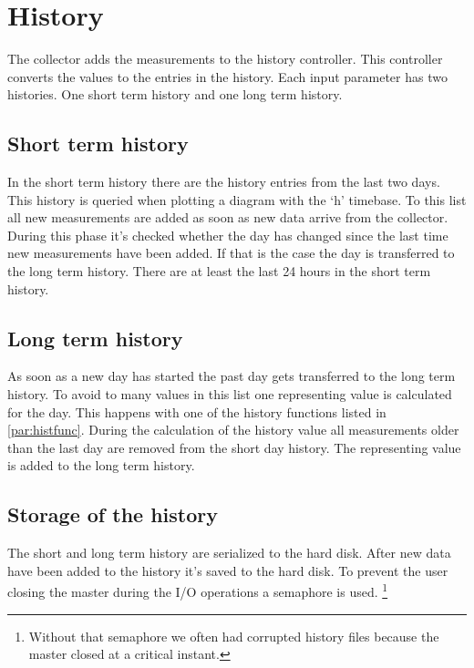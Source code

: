 {\C  }


\section{History} %
\label{sec:history}
The collector adds the measurements to the history controller. This controller converts the values to the entries in the history. Each input parameter has two histories. One short term history and one long term history. 
\subsection{Short term history} %
\label{sub:short_term_history}
In the short term history there are the history entries from the last two days. This history is queried when plotting a diagram with the `h' timebase. To this list all new measurements are added as soon as new data arrive from the collector. During this phase it's checked whether the day has changed since the last time new measurements have been added. If that is the case the day is transferred to the long term history. There are at least the last 24 hours in the short term history.

\subsection{Long term history} %
\label{ssub:long_term_history}
As soon as a new day has started the past day gets transferred to the long term history. To avoid to many values in this list one representing value is calculated for the day. This happens with one of the history functions listed in \ref{par:histfunc}. During the calculation of the history value all measurements older than the last day are removed from the short day history. The representing value is added to the long term history.

\subsection{Storage of the history} %
\label{sub:storage_of_the_history}
The short and long term history are serialized to the hard disk. After new data have been added to the history it's saved to the hard disk. To prevent the user closing the master during the I/O operations a semaphore is used. \footnote{Without that semaphore we often had corrupted history files because the master closed at a critical instant.}

